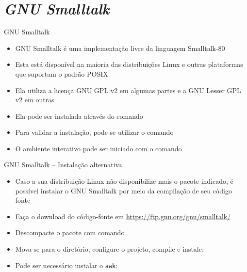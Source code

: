 \section{\it GNU Smalltalk}

\begin{frame}[fragile]{GNU Smalltalk}

    \begin{itemize}
        \item GNU Smalltalk é uma implementação livre da linguagem Smalltalk-80

        \item Esta está disponível na maioria das distribuições Linux e outras plataformas
            que suportam o padrão POSIX

        \item Ela utiliza a licença GNU GPL v2 em algumas partes e a GNU Lesser GPL v2 em outras

        \item Ela pode ser instalada através do comando


        \item Para validar a instalação, pode-se utilizar o comando


        \item O ambiente interativo pode ser iniciado com o comando

    \end{itemize}

\end{frame}

\begin{frame}[fragile]{GNU Smalltalk -- Instalação alternativa}

    \begin{itemize}
        \item Caso a sua distribuição Linux não disponibilize mais o pacote indicado, é possível
            instalar o GNU Smalltalk por meio da compilação de seu código fonte

        \item Faça o download do código-fonte em \url{https://ftp.gnu.org/gnu/smalltalk/}

        \item Descompacte o pacote com comando


        \item Mova-se para o diretório, configure o projeto, compile e instale:


        \item Pode ser necessário instalar o \texttt{awk}:

    \end{itemize}

\end{frame}


